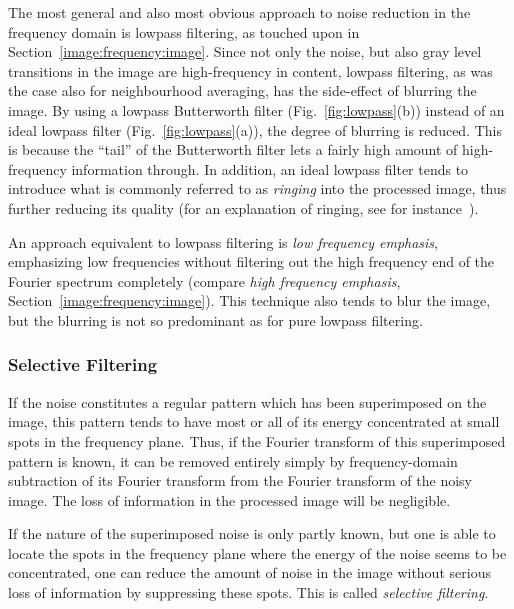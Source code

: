 The most general and also most obvious approach to noise reduction
in the frequency domain is lowpass filtering, as touched upon in
Section~\ref{image:frequency:image}.  Since not only the noise, but
also gray level transitions in the image are high-frequency in
content, lowpass filtering, as was the case also for neighbourhood
averaging, has the side-effect of blurring the image.  By using a
lowpass Butterworth filter (Fig.~\ref{fig:lowpass}(b)) instead of an
ideal lowpass filter (Fig.~\ref{fig:lowpass}(a)), the degree of
blurring is reduced.  This is because the ``tail'' of the Butterworth
filter lets a fairly high amount of high-frequency information
through.  In addition, an ideal lowpass filter tends to introduce what
is commonly referred to as {\em ringing\/} into the processed image,
thus further reducing its quality (for an explanation of ringing, see
for instance~\cite{digim}).

An approach equivalent to lowpass filtering is {\em low frequency
  emphasis\/}, emphasizing low frequencies without filtering out the
high frequency end of the Fourier spectrum completely (compare {\em
  high frequency emphasis\/}, Section~\ref{image:frequency:image}).
This technique also tends to blur the image, but the blurring is not
so predominant as for pure lowpass filtering.

\subsubsection{Selective Filtering}

If the noise constitutes a regular pattern which has been superimposed
on the image, this pattern tends to have most or all of its energy
concentrated at small spots in the frequency plane.  Thus, if the
Fourier transform of this superimposed pattern is known, it can be
removed entirely simply by frequency-domain subtraction of its Fourier
transform from the Fourier transform of the noisy image.  The loss of
information in the processed image will be negligible.

If the nature of the superimposed noise is only partly known, but one
is able to locate the spots in the frequency plane where the energy of
the noise seems to be concentrated, one can reduce the amount of noise
in the image without serious loss of information by suppressing these
spots.  This is called {\em selective filtering\/}.
